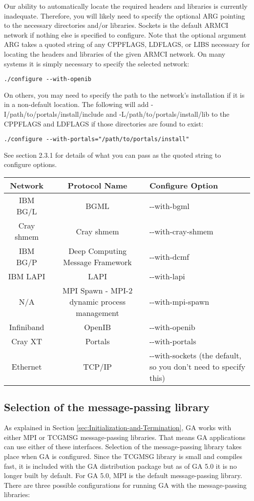 Our ability to automatically locate the required headers and libraries is
currently inadequate. Therefore, you will likely need to specify the optional
ARG pointing to the necessary directories and/or libraries.  Sockets is the
default ARMCI network if nothing else is specified to configure. Note that the
optional argument ARG takes a quoted string of any CPPFLAGS, LDFLAGS, or LIBS
necessary for locating the headers and libraries of the given ARMCI network. On
many systems it is simply necessary to specify the selected network: 
\begin{verbatim}
./configure --with-openib 
\end{verbatim}
On others, you may need to specify the path to the network's installation if it
is in a non-default location. The following will add
-I/path/to/portals/install/include and -L/path/to/portals/install/lib to the
CPPFLAGS and LDFLAGS if those directories are found to exist: 
\begin{verbatim}
./configure --with-portals="/path/to/portals/install"
\end{verbatim}
See section 2.3.1 for details of what you can pass as the quoted string to
configure options. 

\begin{tabular}{|c|c|>{\centering}p{3cm}|}
\hline 
Network & Protocol Name & Configure Option\tabularnewline
\hline
\hline 
IBM BG/L & BGML & -{}-with-bgml\tabularnewline
\hline 
Cray shmem & Cray shmem & -{}-with-cray-shmem\tabularnewline
\hline 
IBM BG/P & Deep Computing Message Framework & -{}-with-dcmf\tabularnewline
\hline 
IBM LAPI & LAPI & -{}-with-lapi\tabularnewline
\hline 
N/A & MPI Spawn - MPI-2 dynamic process management & -{}-with-mpi-spawn\tabularnewline
\hline 
Infiniband & OpenIB & -{}-with-openib\tabularnewline
\hline 
Cray XT & Portals & -{}-with-portals\tabularnewline
\hline 
Ethernet & TCP/IP & -{}-with-sockets (the default, so you don't need to specify this)\tabularnewline
\hline
\end{tabular}

\subsection{Selection of the message-passing library}

As explained in Section \ref{sec:Initialization-and-Termination}, GA works with
either MPI or TCGMSG message-passing libraries. That means GA applications can
use either of these interfaces. Selection of the message-passing library takes
place when GA is configured.  Since the TCGMSG library is small and compiles
fast, it is included with the GA distribution package but as of GA 5.0 it is no
longer built by default. For GA 5.0, MPI is the default message-passing
library.  There are three possible configurations for running GA with the
message-passing libraries:

